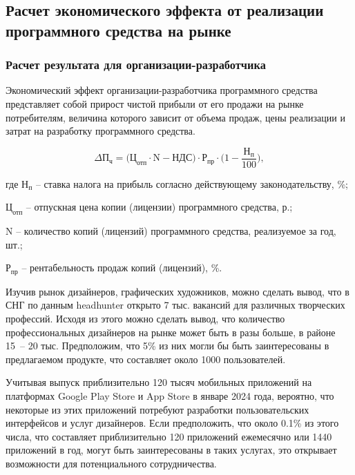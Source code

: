 \fixTableSectionSpace

\subsection{Расчет экономического эффекта от реализации программного средства на рынке}

\subsubsection{Расчет результата для организации-разработчика}

Экономический эффект организации-разработчика программного средства представляет собой прирост чистой прибыли от его продажи на рынке потребителям, величина которого зависит от объема продаж, цены реализации и затрат на разработку программного средства.

\begin{equation}
  \label{eq:econ:deltaPCh}
  \Delta \text{П}_\text{ч} = \bigl(\text{Ц}_\text{отп} \cdot \text{N} - \text{НДС} \bigr) \cdot \text{Р}_\text{пр} \cdot \biggl( 1 - \frac{\text{Н}_\text{п}}{100} \biggr),
\end{equation}
\begin{explanationx}
  \item[где] $ \text{Н}_\text{п} $ -- ставка налога на прибыль согласно действующему законодательству, \%;
  \item $ \text{Ц}_\text{отп} $ -- отпускная цена копии (лицензии) программного средства, р.;
  \item $ \text{N} $ -- количество копий (лицензий) программного средства, реализуемое за год, шт.;
  \item $ \text{Р}_\text{пр} $ -- рентабельность продаж копий (лицензий), \%.
\end{explanationx}


Изучив рынок дизайнеров, графических художников, можно сделать вывод, что в СНГ по данным headhunter открыто 7 тыс. вакансий для различных творческих профессий. Исходя из этого можно сделать вывод, что количество профессиональных дизайнеров на рынке может быть в разы больше, в районе 15~-- 20 тыс. Предположим, что 5\% из них могли бы быть заинтересованы в предлагаемом продукте, что составляет около 1000 пользователей.

Учитывая выпуск приблизительно 120 тысяч мобильных приложений на платформах Google Play Store и App Store в январе 2024 года, вероятно, что некоторые из этих приложений потребуют разработки пользовательских интерфейсов и услуг дизайнеров. Если предположить, что около 0.1\% из этого числа, что составляет приблизительно 120 приложений ежемесячно или 1440 приложений в год, могут быть заинтересованы в таких услугах, это открывает возможности для потенциального сотрудничества.

